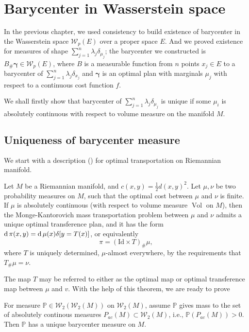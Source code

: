 \section{Barycenter in Wasserstein space}

In the previous chapter,
we used consistency to build existence of barycenter in the Wasserstein space
$\mathcal{W}_p(E)$ over a proper space $E$.
And we proved existence for measures of shape $\sum_{j=1}^{n} \lambda_j \delta_{\mu_j}$;
the barycenter we constructed is $B_{\#}\boldsymbol{\gamma} \in \mathcal{W}_p(E)$,
where $B$ is a measurable function from $n$ points $x_j \in E$ to a barycenter of
$\sum_{j=1}^{n} \lambda_j \delta_{x_j}$
and $\boldsymbol{\gamma}$ is an optimal plan with marginals $\mu_j$ with respect to a continuous cost function $f$.

We shall firstly show that barycenter of $\sum_{j=1}^n \lambda_j \delta_{\mu_j}$
is unique if some $\mu_i$
is absolutely continuous with respect to volume measure on the manifold $M$.

\subsection{Uniqueness of barycenter measure}

We start with a description (\cite[Theorem 10.41]{villani2008optimal})
for optimal transportation on Riemannian manifold.
\begin{thm}
	\label{thm:uniquness_monge_problem_manifold}
	Let \( M \) be a Riemannian manifold, and \( c ( x , y ) = \frac{1}{2} d ( x , y ) ^ { 2 } \).
	Let \( \mu , \nu \) be two probability measures on \( M \), such that the optimal cost
	between \( \mu \) and \( \nu \) is finite.
	If \( \mu \) is absolutely continuous (with respect to volume measure $\operatorname{Vol}$ on $M$),
	then the Monge-Kantorovich mass transportation
	problem between \( \mu \) and \( \nu \) admits a unique optimal transference plan, and it
	has the form \( \operatorname{d} \pi ( x , y ) = \operatorname{d} \mu ( x ) \delta [ y = T ( x ) ] \),
	or equivalently \[ \pi = ( \mathrm { Id } \times T )_{\#} \mu , \]
	where \( T \) is uniquely determined, \( \mu \)-almost everywhere,
	by the requirements that \( T_{\#} \mu = \nu \).
\end{thm}

The map \( T \) may be referred to either as
the optimal map or optimal transference map between \( \mu \) and \( v \).
With the help of this theorem, we are ready to prove
\begin{prop}
	\label{prop:uniquness_barycenter_Wasserstein}
	For measure $\mathbb{P} \in \mathcal{W}_2(\mathcal{W}_2(M))$ on $\mathcal{W}_2(M)$,
	assume $\mathbb{P}$ gives mass to the set of absolutely continous measures $P_{ac}(M) \subset \mathcal{W}_2(M)$,
	i.e.,	$\mathbb{P}(P_{ac}(M)) > 0 $.
	Then $\mathbb{P}$ has a unique barycenter measure on $M$.
\end{prop}

